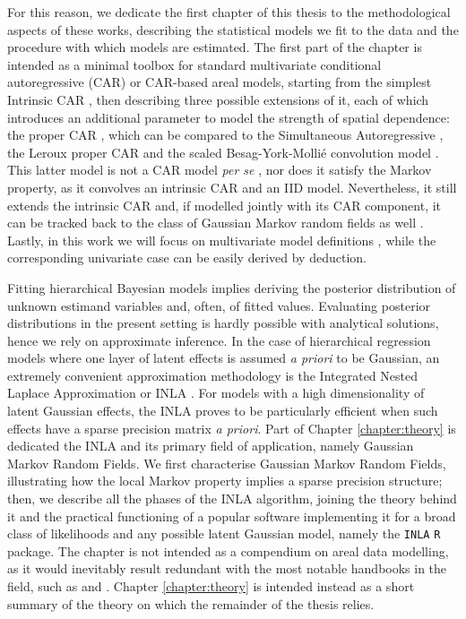 \documentclass[openany, 11pt, oneside]{book}
\begin{document}
For this reason, we dedicate the first chapter of this thesis to the methodological aspects of these works, describing the statistical models we fit to the data and the procedure with which models are estimated. The first part of the chapter is intended as a minimal toolbox for standard multivariate conditional autoregressive (CAR) or CAR-based areal models, starting from the simplest Intrinsic CAR \parencite{CAR, ICAR}, then describing three possible extensions of it, each of which introduces an additional parameter to model the strength of spatial dependence: the proper CAR \parencite{Cressie1993, PCAR_Gelfand}, which can be compared to the Simultaneous Autoregressive \parencite{Cressie1993, Wall2004, VerHoef2018}, the Leroux proper CAR \parencite{Leroux} and the scaled Besag-York-Mollié convolution model \parencite{BYM, BYM2}. This latter model is not a CAR model \textit{per se} \parencite{MacNab}, nor does it satisfy the Markov property, as it convolves an intrinsic CAR and an IID model. Nevertheless, it still extends the intrinsic CAR and, if modelled jointly with its CAR component, it can be tracked back to the class of Gaussian Markov random fields as well \parencite{BYM2}. Lastly, in this work we will focus on multivariate model definitions \parencite{Mardia}, while the corresponding univariate case can be easily derived by deduction. 

Fitting hierarchical Bayesian models implies deriving the posterior distribution of unknown estimand variables and, often, of fitted values. Evaluating posterior distributions in the present setting is hardly possible with analytical solutions, hence we rely on approximate inference. In the case of hierarchical regression models where one layer of latent effects is assumed \textit{a priori} to be Gaussian, an extremely convenient approximation methodology is the Integrated Nested Laplace Approximation or INLA \parencite{INLA}. For models with a high dimensionality of latent Gaussian effects, the INLA proves to be particularly efficient when such effects have a sparse precision matrix \textit{a priori}. Part of Chapter \ref{chapter:theory} is dedicated the INLA and its primary field of application, namely Gaussian Markov Random Fields. We first characterise Gaussian Markov Random Fields, illustrating how the local Markov property implies a sparse precision structure; then, we describe all the phases of the INLA algorithm, joining the theory behind it and the practical functioning of a popular software implementing it for a broad class of likelihoods and any possible latent Gaussian model, namely the \texttt{INLA} \texttt{R} package. The chapter is not intended as a compendium on areal data modelling, as it would inevitably result redundant with the most notable handbooks in the field, such as \cite{Banerjee} and \cite{Martinez-Beneito2019}. Chapter \ref{chapter:theory} is intended instead as a short summary of the theory on which the remainder of the thesis relies.
\end{document}
